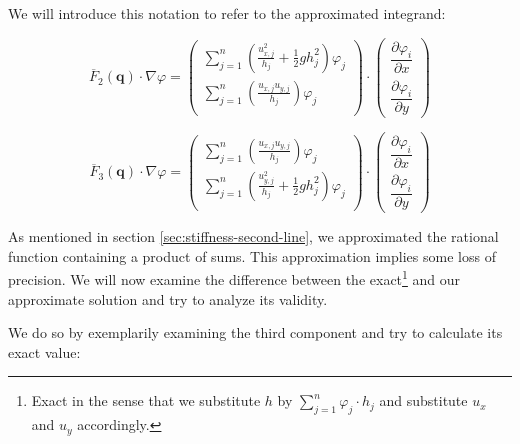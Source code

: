 \documentclass{article}
\newcommand{\pd}[2]{\dfrac{\partial #1}{\partial #2}}
\renewcommand{\phi}{\varphi}
\begin{document}
We will introduce this notation to refer to the approximated integrand:

\begin{equation}
  \label{eq:point-wise-approx-result-second-line}
  \overline{F}_2(\mathbf{q}) \cdot \nabla \phi =
  \begin{pmatrix}
    \sum_{j=1}^n \left(\frac{u_{x,j}^2}{h_j} + \frac{1}{2} g h_j^2\right) \phi_j \\
    \sum_{j=1}^n \left(\frac{u_{x,j} u_{y,j}}{h_j}\right) \phi_j \\
  \end{pmatrix}
  \cdot
  \begin{pmatrix}
    \pd{\phi_i}{x} \\
    \pd{\phi_i}{y}
  \end{pmatrix}
\end{equation}

\begin{equation}
  \label{eq:point-wise-approx-result-third-line}
  \overline{F}_3(\mathbf{q}) \cdot \nabla \phi =
  \begin{pmatrix}
    \sum_{j=1}^n \left(\frac{u_{x,j} u_{y,j}}{h_j}\right) \phi_j \\
    \sum_{j=1}^n \left(\frac{u_{y,j}^2}{h_j} + \frac{1}{2} g h_j^2\right) \phi_j \\
  \end{pmatrix}
  \cdot
  \begin{pmatrix}
    \pd{\phi_i}{x} \\
    \pd{\phi_i}{y}
  \end{pmatrix}
\end{equation}

As mentioned in section \ref{sec:stiffness-second-line}, we approximated the rational function containing a product of sums. This approximation implies some loss of precision. We will now examine the difference between the exact\footnote{Exact in the sense that we substitute $h$ by $\sum_{j=1}^n \phi_j \cdot h_j$ and substitute $u_x$ and $u_y$ accordingly.} and our approximate solution and try to analyze its validity.

We do so by exemplarily examining the third component and try to calculate its exact value:
\end{document}

